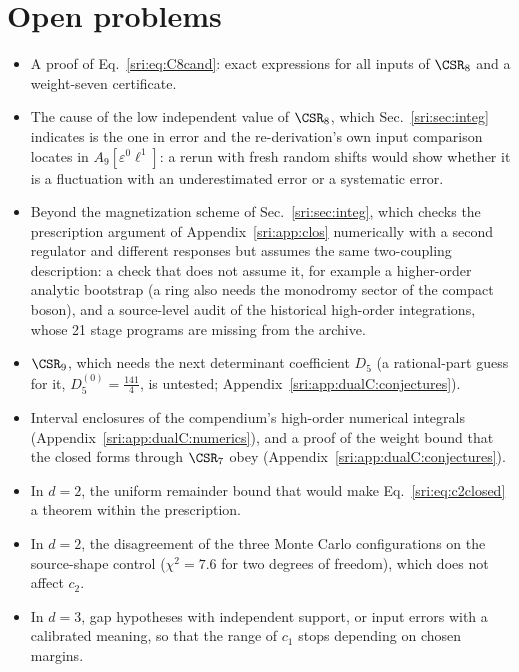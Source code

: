 \section{Open problems}\label{sri:sec:open}
\begin{itemize}
\item A proof of Eq.~\eqref{sri:eq:C8cand}: exact expressions for all inputs of $\CSR_8$ and a weight-seven certificate.
\item The cause of the low independent value of $\CSR_8$, which Sec.~\ref{sri:sec:integ} indicates is the one in error
 and the re-derivation's own input comparison locates in $A_9[\varepsilon^0\ell^1]$: a rerun with fresh random shifts
 would show whether it is a fluctuation with an underestimated error or a systematic error.
\item Beyond the magnetization scheme of Sec.~\ref{sri:sec:integ}, which checks the prescription argument of
 Appendix~\ref{sri:app:clos} numerically with a second regulator and different responses but assumes the same two-coupling
 description: a check that does not assume it, for example a higher-order analytic bootstrap (a ring also needs the
 monodromy sector of the compact boson), and a source-level audit of the historical high-order integrations, whose 21
 stage programs are missing from the archive.
\item $\CSR_9$, which needs the next determinant coefficient $D_5$ (a rational-part guess for it,
 $D_5^{(0)}=\frac{141}{4}$, is untested; Appendix~\ref{sri:app:dualC:conjectures}).
\item Interval enclosures of the compendium's high-order numerical integrals (Appendix~\ref{sri:app:dualC:numerics}), and a
 proof of the weight bound that the closed forms through $\CSR_7$ obey (Appendix~\ref{sri:app:dualC:conjectures}).
\item In $d=2$, the uniform remainder bound that would make Eq.~\eqref{sri:eq:c2closed} a theorem within the prescription.
\item In $d=2$, the disagreement of the three Monte Carlo configurations on the source-shape control ($\chi^2=7.6$ for
 two degrees of freedom), which does not affect $c_2$.
\item In $d=3$, gap hypotheses with independent support, or input errors with a calibrated meaning, so that the range of
 $c_1$ stops depending on chosen margins.
\end{itemize}

\appendix
{}
